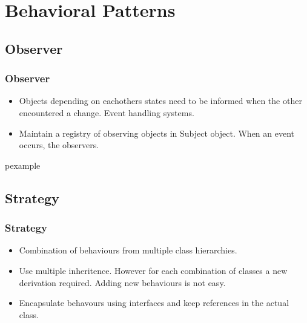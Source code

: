 \documentclass[trans,compress,xcolor=table]{beamer}
\begin{document}
\section{Behavioral Patterns}
\subsection{Observer}
\begin{frame}
\frametitle{Observer}
\begin{itemize}
\item {} Objects depending on eachothers states need to
be informed when the other encountered a change. Event handling systems.
\item {} Maintain a registry of observing objects
in Subject object. When an event occurs,  the observers.
\end{itemize}
\end{frame}

\begin{frame}
\begin{beamercolorbox}{pexample}
\codeobs
\end{beamercolorbox}
\end{frame}

\subsection{Strategy}
\begin{frame}
\frametitle{Strategy}
\begin{itemize}
\item {} Combination of behaviours  from multiple class 
hierarchies.
\item {} Use multiple inheritence. However for
each combination of classes a new derivation required. Adding new behaviours
is not easy.
\item {} Encapsulate behavours using interfaces and
keep references in the actual class.
\end{itemize}
\end{frame}
\end{document}
